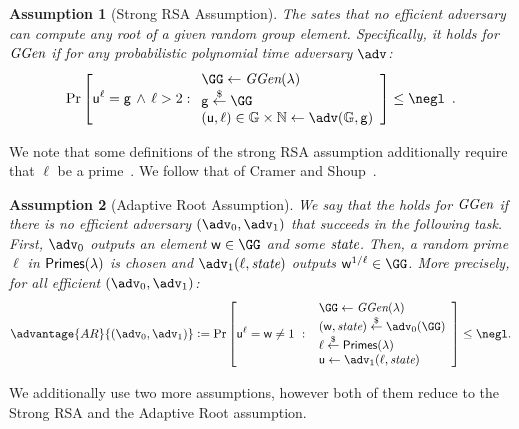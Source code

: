\documentclass{article}
\newtheorem{assumption}{Assumption}
\begin{document}
\begin{assumption}[Strong RSA Assumption]
The  sates that no efficient adversary can compute any root of a given random group element. Specifically, it holds for $\textit{GGen}$ if for any probabilistic polynomial time adversary $\adv$:
\[
    \Pr\left[\gr{u}^\ell = \gr{g} \, \wedge \, \ell > 2:
    \begin{array}{l}
         \GG \leftarrow \ggen(\lambda)  \\
         \gr{g} \sample \GG \\
         (\gr{u}, \ell) \in \mathbb{G} \times \mathbb{N} \leftarrow \adv(\mathbb{G}, \gr{g}) \\
    \end{array}\right] \leq \negl \enspace .
\]
\end{assumption}
We note that some definitions of the strong RSA assumption additionally require that $\ell$ be a prime~\cite{EC:BarPfi97,journals/iacr/BonehBF18a}. We follow that of Cramer and Shoup~\cite{CCS:CraSho99}.

\begin{assumption}[Adaptive Root Assumption]
\label{assum:adaptiveroot}
We say that the  holds for $\textit{GGen}$ if 
there is no efficient adversary $(\adv_0,\adv_1)$ that succeeds 
in the following task.
First, $\adv_0$ outputs an element $\gr{w} \in \GG$ and some $\textit{state}$.
Then, a random prime $\ell$ in $\textsf{Primes}(\lambda)$ is chosen
and $\adv_1(\ell,\state)$ outputs $\gr{w}^{1/\ell} \in \GG$.
More precisely, for all efficient $(\adv_0,\adv_1)$:
\[           \advantage{AR}{(\adv_0,\adv_1)}\deq 
                \Pr\left[\gr{u}^\ell = \gr{w} \neq 1 \ : \ 
                \begin{array}{l}
                      \GG \gets \ggen(\lambda) \\ 
                      (\gr{w},\state) \sample \adv_0(\GG) \\
                      \ell \sample \primes \\ 
                      \gr{u} \gets \adv_1(\ell, \state)
                \end{array} 
        \right] \leq \negl.
\]
\end{assumption}

We additionally use two more assumptions, however both of them reduce to the Strong RSA and the Adaptive Root assumption.
\end{document}

